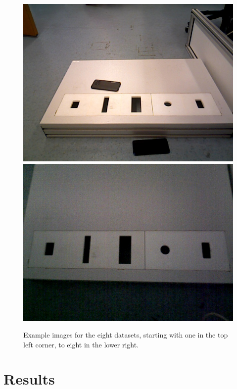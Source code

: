 \documentclass{article}
\begin{document}
\begin{figure}[h!]
\begin{minipage}{\textwidth}
\includegraphics[scale=0.15]{images/Seventh_set.jpg}
\includegraphics[scale=0.15]{images/Eigth_set.jpg}
\caption{Example images for the eight datasets, starting with one in the top left corner, to eight in the lower right.}
\label{fig:datasets}
\end{minipage}
\end{figure}

\section{Results}
\end{document}

